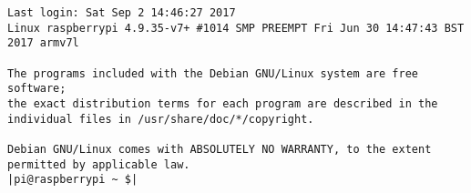 \begin{lstlisting}
Last login: Sat Sep 2 14:46:27 2017
Linux raspberrypi 4.9.35-v7+ #1014 SMP PREEMPT Fri Jun 30 14:47:43 BST 2017 armv7l

The programs included with the Debian GNU/Linux system are free software;
the exact distribution terms for each program are described in the
individual files in /usr/share/doc/*/copyright.

Debian GNU/Linux comes with ABSOLUTELY NO WARRANTY, to the extent
permitted by applicable law.
|pi@raspberrypi ~ $|
\end{lstlisting}
